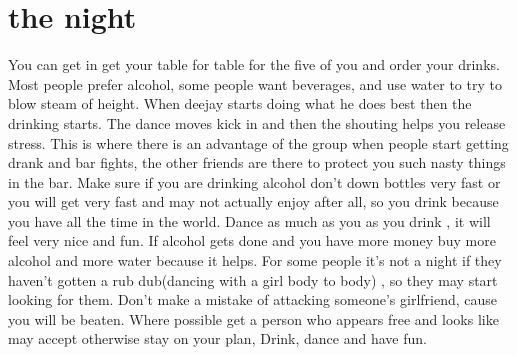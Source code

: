 \documentclass{article}
\begin{document}
\section{the night}
You can get in get your table for table for the five of you and order your drinks. Most people prefer alcohol, some people want beverages, and use water to try to blow steam of height. When deejay starts doing what he does best then the drinking starts. The dance moves kick in and then the shouting helps you release stress. This is where there is an advantage of the group when people start getting drank and bar fights, the other friends are there to protect you such nasty things in the bar.
Make sure if you are drinking alcohol don’t down bottles very fast or you will get very fast and may not actually enjoy after all, so you drink because you have all the time in the world. Dance as much as you as you drink , it will feel very nice and fun. If alcohol gets done and you have more money buy more alcohol and more water because it helps. For some people it’s not a night if they haven’t gotten a rub dub(dancing with a girl body to body) , so they may start looking for them. Don’t make a mistake of attacking someone’s girlfriend, cause you will be beaten. Where possible get a person who appears free and looks like may accept otherwise stay on your plan, Drink, dance and have fun.
\end{document}
